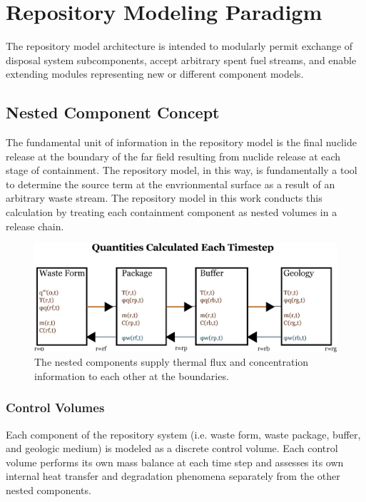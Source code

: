 \section{Repository Modeling Paradigm}

The repository model architecture is intended to modularly permit 
exchange of disposal system subcomponents, accept arbitrary spent fuel 
streams, and enable extending modules representing new or different 
component models.

\subsection{Nested Component Concept}

The fundamental unit of information in the repository model is the final nuclide  
release at the boundary of the far field resulting from nuclide release at 
each stage of containment.  The repository model, in this way, is fundamentally 
a tool to determine the source term at the envrionmental surface as a result 
of an arbitrary waste stream. The repository model in this work conducts this 
calculation by  treating each containment component as nested volumes in a 
release chain. 

\begin{figure}[h!]
  \begin{center}
    \includegraphics[width=\textwidth]{./chapters/paradigm/flow.eps}
  \end{center}
  \caption{The nested components supply thermal flux and concentration 
  information to each other at the boundaries.}
  \label{fig:flow}
\end{figure}


\subsubsection{Control Volumes}

Each component of the repository system (i.e. waste form, waste package, buffer, 
and geologic medium) is modeled as a discrete control volume. Each control 
volume performs its own mass balance at each time step and assesses its own 
internal  heat transfer and degradation phenomena separately from the other 
nested components.

